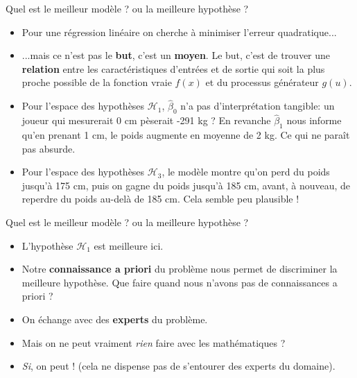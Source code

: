 \begin{frame}{Quel est le meilleur modèle ? ou la meilleure hypothèse ?}
	\begin{itemize}
		\item Pour une régression linéaire on cherche à minimiser l'erreur quadratique...
		\pause
		\item ...mais ce n'est pas le \textbf{but}, c'est un \textbf{moyen}. Le but, c'est de trouver une \textbf{relation} entre les caractéristiques d'entrées et de sortie qui soit la plus proche possible de la fonction vraie $f(x)$ et du processus générateur $g(u)$.
		\pause
		\item Pour l'espace des hypothèses $\mathcal{H}_1$, $\hat{\beta}_0$ n'a pas d'interprétation tangible: un joueur qui mesurerait 0 cm pèserait -291 kg ? En revanche $\hat{\beta}_1$ nous informe qu'en prenant 1 cm, le poids augmente en moyenne de 2 kg. Ce qui ne paraît pas absurde.
		\pause
		\item Pour l'espace des hypothèses $\mathcal{H}_3$, le modèle montre qu'on perd du poids jusqu'à 175 cm, puis on gagne du poids jusqu'à 185 cm, avant, à nouveau, de reperdre du poids au-delà de 185 cm. Cela semble peu plausible !
	\end{itemize}
\end{frame}

\begin{frame}{Quel est le meilleur modèle ? ou la meilleure hypothèse ?}
	\begin{itemize}
		\item L'hypothèse $\mathcal{H}_1$ est meilleure ici.
		\pause
		\item Notre \textbf{connaissance a priori} du problème nous permet de discriminer la meilleure hypothèse. Que faire quand nous n'avons pas de connaissances a priori ?
		\pause
		\item On échange avec des \textbf{experts} du problème.
		\pause
		\item Mais on ne peut vraiment \textit{rien} faire avec les mathématiques ?
		\pause
		\item \textit{Si}, on peut ! (cela ne dispense pas de s'entourer des experts du domaine).
	\end{itemize}
\end{frame}

